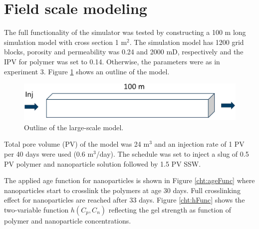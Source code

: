 \section{Field scale modeling}
The full functionality of the simulator was tested by constructing a 100 m long simulation model with cross section 1 m$^2$. The simulation model has 1200 grid blocks, porosity and permeability was 0.24 and 2000 mD, respectively and the  IPV for polymer was set to 0.14. Otherwise, the parameters were as in experiment 3. Figure \ref{fig:largeScaleModel} shows an outline of the model.
\begin{figure}[h]
    \centering
    \includegraphics[width=\textwidth]{img/fig/largeScaleModel.png}
    \caption{Outline of the large-scale model. }
    \label{fig:largeScaleModel}
\end{figure}

Total pore volume (PV) of the model was 24 m$^3$ and an injection rate of 1 PV per 40 days were used (0.6 m$^3$/day). The schedule was set to inject a slug of 0.5 PV polymer and nanoparticle solution followed by 1.5 PV SSW. 

The applied  age function for nanoparticles is shown in Figure \ref{cht:ageFunc} where nanoparticles start to crosslink the polymers at age 30 days. Full crosslinking effect for nanoparticles are reached after 33 days. Figure \ref{cht:hFunc} shows the two-variable function $h(C_p,C_n)$  reflecting the gel strength as function of polymer and nanoparticle concentrations.      

